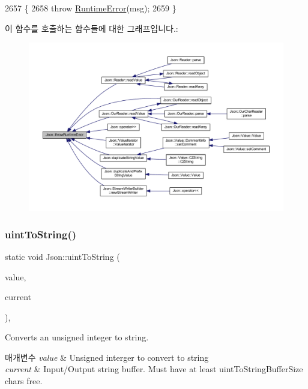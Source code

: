 \begin{DoxyCode}
2657 \{
2658   \textcolor{keywordflow}{throw} \hyperlink{class_json_1_1_runtime_error}{RuntimeError}(msg);
2659 \}
\end{DoxyCode}
이 함수를 호출하는 함수들에 대한 그래프입니다.\+:
\nopagebreak
\begin{figure}[H]
\begin{center}
\leavevmode
\includegraphics[width=350pt]{namespace_json_a0ab7ff7f99788262d92d9ff3d924e065_icgraph}
\end{center}
\end{figure}
\mbox{\label{namespace_json_ac1ffd21a9e55122014353c773ccc496e}} 
\subsubsection{\texorpdfstring{uint\+To\+String()}{uintToString()}}
{\footnotesize\ttfamily static void Json\+::uint\+To\+String (\begin{DoxyParamCaption}\item[{\hyperlink{namespace_json_ae202ecad69725e23443f465e257456d0}{Largest\+U\+Int}}]{value,  }\item[{char $\ast$\&}]{current }\end{DoxyParamCaption})\hspace{0.3cm}{\ttfamily [inline]}, {\ttfamily [static]}}

Converts an unsigned integer to string. 
\begin{DoxyParams}{매개변수}
{\em value} & Unsigned interger to convert to string \\
\hline
{\em current} & Input/\+Output string buffer. Must have at least uint\+To\+String\+Buffer\+Size chars free. \\
\hline
\end{DoxyParams}


